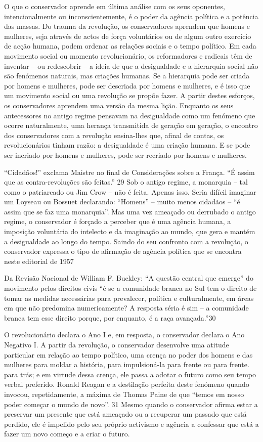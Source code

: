 O que o conservador aprende em última análise com os seus oponentes, intencionalmente ou inconscientemente, é o poder da agência política e a potência das massas. Do trauma da revolução, os conservadores aprendem que homens e mulheres, seja através de actos de força voluntários ou de algum outro exercício de acção humana, podem ordenar as relações sociais e o tempo político. Em cada movimento social ou momento revolucionário, os reformadores e radicais têm de inventar – ou redescobrir – a ideia de que a desigualdade e a hierarquia social não são fenómenos naturais, mas criações humanas. Se a hierarquia pode ser criada por homens e mulheres, pode ser descriada por homens e mulheres, e é isso que um movimento social ou uma revolução se propõe fazer. A partir destes esforços, os conservadores aprendem uma versão da mesma lição. Enquanto os seus antecessores no antigo regime pensavam na desigualdade como um fenómeno que ocorre naturalmente, uma herança transmitida de geração em geração, o encontro dos conservadores com a revolução ensina-lhes que, afinal de contas, os revolucionários tinham razão: a desigualdade é uma criação humana. E se pode ser incriado por homens e mulheres, pode ser recriado por homens e mulheres.
 \par 
“Cidadãos!” exclama Maistre no final de Considerações sobre a França. “É assim que as contra-revoluções são feitas.” {\color{blue}29} Sob o antigo regime, a monarquia – tal como o patriarcado ou Jim Crow – não é feita. Apenas isso. Seria difícil imaginar um Loyseau ou Bossuet declarando: “Homens” – muito menos cidadãos – “é assim que se faz uma monarquia”. Mas uma vez ameaçado ou derrubado o antigo regime, o conservador é forçado a perceber que é uma agência humana, a imposição voluntária do intelecto e da imaginação ao mundo, que gera e mantém a desigualdade ao longo do tempo. Saindo do seu confronto com a revolução, o conservador expressa o tipo de afirmação de agência política que se encontra neste editorial de 1957
 \par 
Da Revisão Nacional de William F. Buckley: “A questão central que emerge” do movimento pelos direitos civis “é se a comunidade branca no Sul tem o direito de tomar as medidas necessárias para prevalecer, política e culturalmente, em áreas em que não predomina numericamente? A resposta séria é sim – a comunidade branca tem esse direito porque, por enquanto, é a raça avançada.”{\color{blue}30}
 \par 
O revolucionário declara o Ano I e, em resposta, o conservador declara o Ano Negativo I. A partir da revolução, o conservador desenvolve uma atitude particular em relação ao tempo político, uma crença no poder dos homens e das mulheres para moldar a história, para impulsioná-la para frente ou para frente. para trás; e em virtude dessa crença, ele passa a adotar o futuro como seu tempo verbal preferido. Ronald Reagan e a destilação perfeita deste fenómeno quando invocou, repetidamente, a máxima de Thomas Paine de que “temos em nosso poder começar o mundo de novo”. {\color{blue}31} Mesmo quando o conservador afirma estar a preservar um presente que está ameaçado ou a recuperar um passado que está perdido, ele é impelido pelo seu próprio activismo e agência a confessar que está a fazer um novo começo e a criar o futuro.
